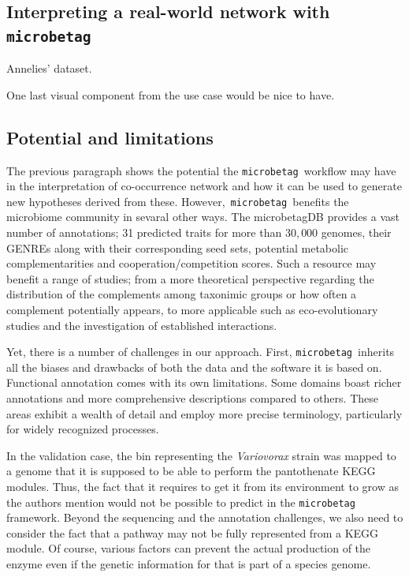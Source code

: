 \documentclass[sn-mathphys,Numbered]{sn-jnl}  %
\theoremstyle{thmstyleone}%
\theoremstyle{thmstyletwo}%
\theoremstyle{thmstylethree}%
\newcommand{\microbetag}{\texttt{microbetag }}
\begin{document}



    \subsection*{Interpreting a real-world network with \microbetag}
        \label{subsec:usecase}


        Annelies' dataset. 

        One last visual component from the use case would be nice to have.  





    \subsection*{Potential and limitations}
    \label{subsec:pot-and-limits}

        The previous paragraph shows the potential the \microbetag workflow may have in the interpretation of co-occurrence network and how it can be used to generate new hypotheses derived from these.
        However,~\microbetag benefits the microbiome community in sevaral other ways. 
        The microbetagDB provides a vast number of annotations; 31 predicted traits for more than $30,000$ genomes, their GENREs along with their corresponding seed sets, potential metabolic complementarities and cooperation/competition scores.
        Such a resource may benefit a range of studies; 
        from a more theoretical perspective regarding the distribution of the complements among taxonimic groups or how often a complement potentially appears, to more applicable such as eco-evolutionary studies and the investigation of established interactions.

        Yet, there is a number of challenges in our approach.
        First, \microbetag inherits all the biases and drawbacks of both the data and the software it is based on.
        Functional annotation comes with its own limitations.
        Some domains boast richer annotations and more comprehensive descriptions compared to others. 
        These areas exhibit a wealth of detail and employ more precise terminology, particularly for widely recognized processes.

        In the validation case, the bin representing the \textit{Variovorax} strain was mapped to a genome that it is supposed to be able to perform the pantothenate KEGG modules.
        Thus, the fact that it requires to get it from its environment to grow as the authors mention would not be possible to predict in the \microbetag framework. 
        Beyond the sequencing and the annotation challenges, we also need to consider the fact that a pathway may not be fully represented from a KEGG module.
        Of course, various factors can prevent the actual production of the enzyme even if the genetic information for that is part of a species genome.
        
\end{document}
